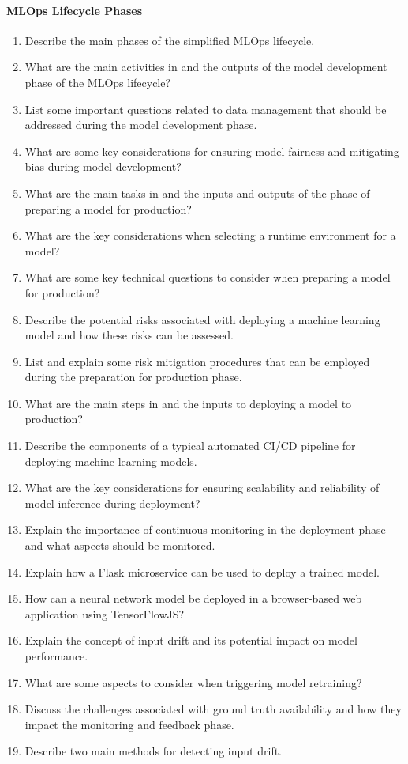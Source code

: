 \paragraph*{MLOps Lifecycle Phases}
\begin{enumerate}
    \item Describe the main phases of the simplified MLOps lifecycle.

    \item What are the main activities in and the outputs of the model development phase of the MLOps lifecycle?
    \item List some important questions related to data management that should be addressed during the model development phase.
    \item What are some key considerations for ensuring model fairness and mitigating bias during model development?

    \item What are the main tasks in and the inputs and outputs of the phase of preparing a model for production?
    \item What are the key considerations when selecting a runtime environment for a model?
    \item What are some key technical questions to consider when preparing a model for production?
    \item Describe the potential risks associated with deploying a machine learning model and how these risks can be assessed.
    \item List and explain some risk mitigation procedures that can be employed during the preparation for production phase.

    \item What are the main steps in and the inputs to deploying a model to production?
    \item Describe the components of a typical automated CI/CD pipeline for deploying machine learning models.
    \item What are the key considerations for ensuring scalability and reliability of model inference during deployment?
    \item Explain the importance of continuous monitoring in the deployment phase and what aspects should be monitored.
    \item Explain how a Flask microservice can be used to deploy a trained model.
    \item How can a neural network model be deployed in a browser-based web application using TensorFlowJS?

    \item Explain the concept of input drift and its potential impact on model performance.
    \item What are some aspects to consider when triggering model retraining?
    \item Discuss the challenges associated with ground truth availability and how they impact the monitoring and feedback phase.
    \item Describe two main methods for detecting input drift.
\end{enumerate}
